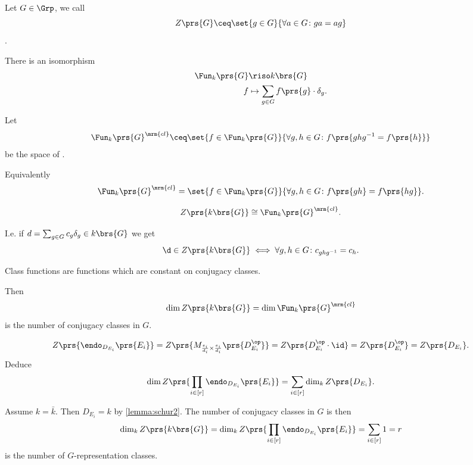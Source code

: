\documentclass[10pt,a4paper,twoside,openany,hidelinks]{book}
\begin{document}
\begin{definition}[Center]
Let $G \in \Grp$, we call
\[Z\prs{G} \ceq \set{g \in G}{\forall a \in G \colon ga = ag}\]
. 
\end{definition}

\begin{remark}
There is an isomorphism
\begin{align*}
\Fun_k\prs{G} &\riso k\brs{G} \\
f &\mapsto \sum_{g \in G} f\prs{g} \cdot \delta_g \text{.}
\end{align*}
\end{remark}

\begin{definition}
Let
\[\Fun_k\prs{G}^{\mrm{cl}} \ceq \set{f \in \Fun_k\prs{G}}{\forall g,h \in G \colon f\prs{ghg^{-1} = f\prs{h}}}\]
be the space of .
\end{definition}

\begin{remark}
Equivalently \[\Fun_k\prs{G}^{\mrm{cl}} = \set{f \in \Fun_k\prs{G}}{\forall g,h \in G \colon f\prs{gh} = f\prs{hg}} \text{.}\]
\end{remark}

\begin{exercise}
\[Z\prs{k\brs{G}} \cong \Fun_k\prs{G}^{\mrm{cl}} \text{.}\]

I.e. if $d = \sum_{g \in G} c_g \delta_g \in k\brs{G}$
we get
\[\d \in Z\prs{k\brs{G}} \iff \forall g,h \in G \colon c_{ghg^{-1}} = c_h \text{.}\]
\end{exercise}

\begin{remark}
Class functions are functions which are constant on conjugacy classes.

Then
\[\dim Z\prs{k\brs{G}} = \dim \Fun_k\prs{G}^{\mrm{cl}}\]
is the number of conjugacy classes in $G$.
\end{remark}

\begin{exercise}
\[Z\prs{\endo_{D_{E_i}}\prs{E_i}} = Z\prs{M_{\frac{e_i}{d_i} \times \frac{e_i}{d_i}} \prs{D_{E_i}^\op}} = Z\prs{D_{E_i}^\op \cdot \id} = Z\prs{D_{E_i}^\op} = Z\prs{D_{E_i}} \text{.}\]
Deduce
\[\dim Z\prs{\prod_{i \in [r]} \endo_{D_{E_i}}\prs{E_i}} = \sum_{i \in [r]} \dim_k Z\prs{D_{E_i}} \text{.}\]
\end{exercise}

\begin{corollary}
Assume $k = \bar{k}$. Then $D_{E_i} = k$ by \ref{lemma:schur2}. The number of conjugacy classes in $G$ is then
\[\dim_k Z\prs{k\brs{G}} = \dim_k Z\prs{\prod_{i \in [r]} \endo_{D_{E_i}}\prs{E_i}} = \sum_{i \in [r]} 1 = r\]
is the number of $G$-representation classes.
\end{corollary}
\end{document}
